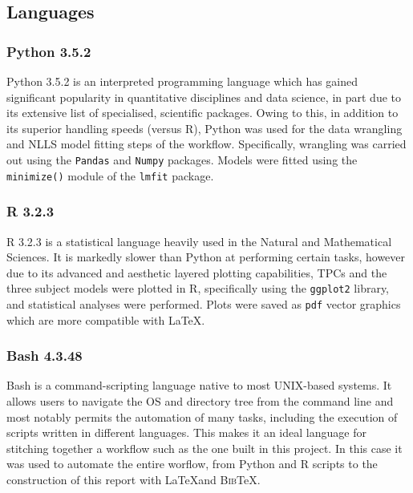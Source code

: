 \documentclass[11pt]{article}
\begin{document}
        \subsection{Languages}
            \subsubsection{Python 3.5.2}
                Python 3.5.2 is an interpreted programming language which has gained significant popularity in quantitative disciplines and data science, in part due to its extensive list of specialised, scientific packages. Owing to this, in addition to its superior handling speeds (versus R), Python was used for the data wrangling and NLLS model fitting steps of the workflow. Specifically, wrangling was carried out using the \texttt{Pandas} and \texttt{Numpy}   packages. Models were fitted using the \texttt{minimize()}  module of the \texttt{lmfit} package.
            \subsubsection{R 3.2.3}
                R 3.2.3  is a statistical language heavily used in the Natural and Mathematical Sciences. It is markedly slower than Python at performing certain tasks, however due to its advanced and aesthetic layered plotting capabilities, TPCs and the three subject models were plotted in R, specifically using the \texttt{ggplot2} library, and statistical analyses were performed. Plots were saved as \texttt{pdf} vector graphics which are more compatible with \LaTeX.
            \subsubsection{Bash 4.3.48}
                Bash is a command-scripting language native to most UNIX-based systems. It allows users to navigate the OS and directory tree from the command line and most notably permits the automation of many tasks, including the execution of scripts written in different languages. This makes it an ideal language for stitching together a workflow such as the one built in this project. In this case it was used to automate the entire worflow, from Python and R scripts to the construction of this report with \LaTeX  and \textsc{Bib}\TeX. \newpage
\end{document}
